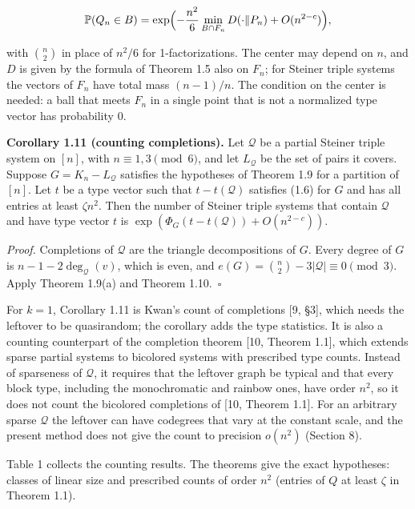 \documentclass[english,11pt,a4paper]{article}
\begin{document}
\nopagebreak[4]
\[\mathbb P(Q_n\in B)=\exp\Bigl(-\frac{n^2}{6}\min_{B\cap F_n}D(\cdot\Vert P_n)+O(n^{2-c})\Bigr),\]

with \(\binom n2\) in place of \(n^2/6\) for 1-factorizations. The center may depend on \(n\), and \(D\) is given by the formula of Theorem 1.5 also on \(F_n\); for Steiner triple systems the vectors of \(F_n\) have total mass \((n-1)/n\). The condition on the center is needed: a ball that meets \(F_n\) in a single point that is not a normalized type vector has probability \(0\).

\textbf{Corollary 1.11 (counting completions).} Let \(\mathcal Q\) be a partial Steiner triple system on \([n]\), with \(n\equiv1,3\pmod 6\), and let \(L_{\mathcal Q}\) be the set of pairs it covers. Suppose \(G=K_n-L_{\mathcal Q}\) satisfies the hypotheses of Theorem 1.9 for a partition of \([n]\). Let \(t\) be a type vector such that \(t-t(\mathcal Q)\) satisfies (1.6) for \(G\) and has all entries at least \(\zeta n^2\). Then the number of Steiner triple systems that contain \(\mathcal Q\) and have type vector \(t\) is \(\exp(\Phi_G(t-t(\mathcal Q))+O(n^{2-c}))\).

\emph{Proof.} Completions of \(\mathcal Q\) are the triangle decompositions of \(G\). Every degree of \(G\) is \(n-1-2\deg_{\mathcal Q}(v)\), which is even, and \(e(G)=\binom n2-3|\mathcal Q|\equiv0\pmod 3\). Apply Theorem 1.9(a) and Theorem 1.10.~\(\square\)

For \(k=1\), Corollary 1.11 is Kwan's count of completions {[}9, §3{]}, which needs the leftover to be quasirandom; the corollary adds the type statistics. It is also a counting counterpart of the completion theorem {[}10, Theorem 1.1{]}, which extends sparse partial systems to bicolored systems with prescribed type counts. Instead of sparseness of \(\mathcal Q\), it requires that the leftover graph be typical and that every block type, including the monochromatic and rainbow ones, have order \(n^2\), so it does not count the bicolored completions of {[}10, Theorem 1.1{]}. For an arbitrary sparse \(\mathcal Q\) the leftover can have codegrees that vary at the constant scale, and the present method does not give the count to precision \(o(n^2)\) (Section 8).

Table 1 collects the counting results. The theorems give the exact hypotheses: classes of linear size and prescribed counts of order \(n^2\) (entries of \(Q\) at least \(\zeta\) in Theorem 1.1).
\end{document}
